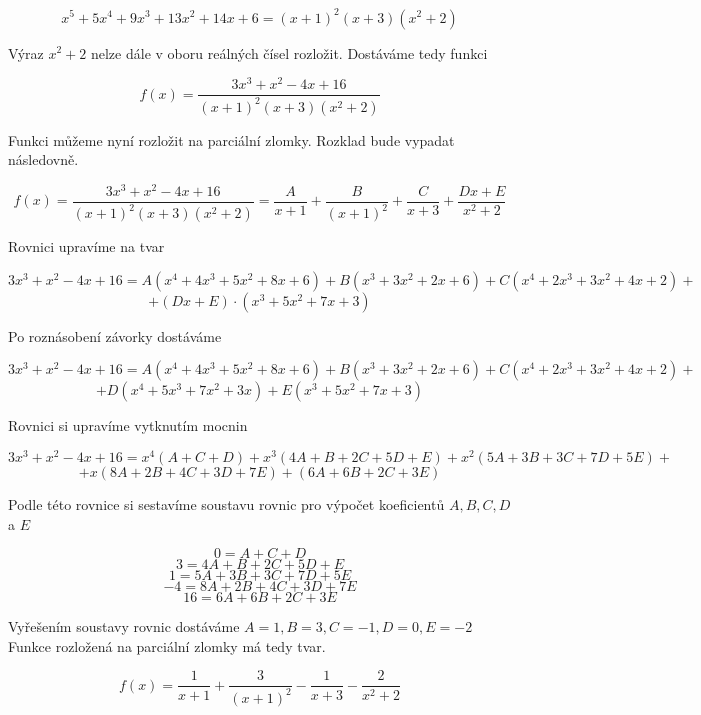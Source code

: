\begin{displaymath}
	x^5+5x^4+9x^3+13x^2+14x+6 = (x+1)^2(x+3)(x^2+2)
\end{displaymath}

Výraz $x^2+2$ nelze dále v oboru reálných čísel rozložit. Dostáváme tedy funkci

\begin{displaymath}
f(x)=\frac{3x^3+x^2-4x+16}{(x+1)^2(x+3)(x^2+2)}
\end{displaymath}

Funkci můžeme nyní rozložit na parciální zlomky. Rozklad bude vypadat následovně.

\begin{displaymath}
f(x)=\frac{3x^3+x^2-4x+16}{(x+1)^2(x+3)(x^2+2)}
=
\frac{A}{x+1} +
\frac{B}{(x+1)^2} +
\frac{C}{x+3} +
\frac{Dx+E}{x^2+2}
\end{displaymath}

Rovnici upravíme na tvar

\begin{displaymath}
3x^3+x^2-4x+16 = A(x^4 + 4x^3+5x^2+8x+6) + B(x^3+3x^2+2x+6) + C(x^4+2x^3+3x^2+4x+2) + 
\end{displaymath}
\begin{displaymath}
+(Dx+E)\cdot(x^3+5x^2+7x+3)
\end{displaymath}

Po roznásobení závorky dostáváme

\begin{displaymath}
3x^3+x^2-4x+16 = A(x^4 + 4x^3+5x^2+8x+6) + B(x^3+3x^2+2x+6) + C(x^4+2x^3+3x^2+4x+2) +
\end{displaymath}
\begin{displaymath}
+D(x^4+5x^3+7x^2+3x) + E(x^3+5x^2+7x+3)
\end{displaymath}

Rovnici si upravíme vytknutím mocnin

\begin{displaymath}
3x^3+x^2-4x+16 = x^4(A+C+D) + x^3(4A+B+2C+5D+E) + x^2(5A+3B+3C+7D+5E) + 
\end{displaymath}
\begin{displaymath}
+x(8A+2B+4C+3D+7E) + (6A+6B+2C+3E)
\end{displaymath}

Podle této rovnice si sestavíme soustavu rovnic pro výpočet koeficientů $A, B, C, D$ a $E$

\begin{displaymath}
0 = A + C + D
\end{displaymath}
\begin{displaymath}
3 = 4A + B + 2C + 5D + E
\end{displaymath}
\begin{displaymath}
1 = 5A + 3B + 3C + 7D + 5E
\end{displaymath}
\begin{displaymath}
-4 = 8A + 2B + 4C + 3D + 7E
\end{displaymath}
\begin{displaymath}
16 = 6A + 6B + 2C + 3E
\end{displaymath}

Vyřešením soustavy rovnic dostáváme $A=1, B=3, C=-1, D=0, E=-2$ Funkce rozložená na parciální zlomky má tedy tvar.

\begin{displaymath}
f(x)=
\frac{1}{x+1} +
\frac{3}{(x+1)^2} -
\frac{1}{x+3} -
\frac{2}{x^2+2}
\end{displaymath}
